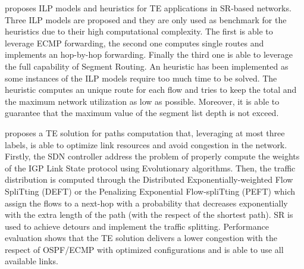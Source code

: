 \cite{moreno2017traffic} proposes ILP models and heuristics for TE applications in SR-based networks. Three ILP models are proposed and they are only used as benchmark for the heuristics due to their high computational complexity. The first is able to leverage ECMP forwarding, the second one computes single routes and implements an hop-by-hop forwarding. Finally the third one is able to leverage the full capability of Segment Routing. An heuristic has been implemented as some instances of the ILP models require too much time to be solved. The heuristic computes an unique route for each flow and tries to keep the total and the maximum network utilization as low as possible. Moreover, it is able to guarantee that the maximum value of the segment list depth is not exceed. 

\cite{pereira2017optimizing} proposes a TE solution for paths computation that, leveraging at most three labels, is able to optimize link resources and avoid congestion in the network. Firstly, the SDN controller address the problem of properly compute the weights of the IGP Link State protocol using Evolutionary algorithms. Then, the traffic distribution is computed through the Distributed Exponentially-weighted Flow SpliTting (DEFT) or the Penalizing Exponential Flow-spliTting (PEFT) which assign the flows to a next-hop with a probability that decreases exponentially with the extra length of the path (with the respect of the shortest path). SR is used to achieve detours and implement the traffic splitting. Performance evaluation shows that the TE solution delivers a lower congestion with the respect of OSPF/ECMP with optimized configurations and is able to use all available links. %

